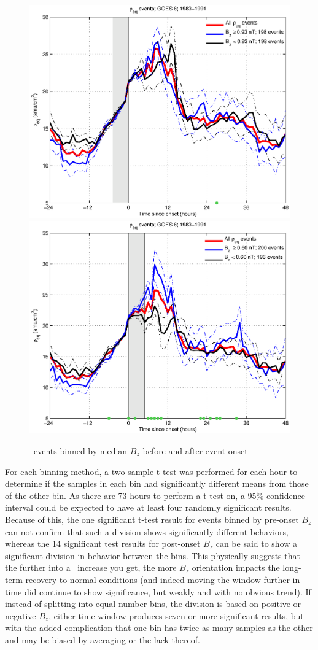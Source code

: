 \begin{figure}[htp!]
	\centering
	\includegraphics[width=0.7\linewidth]{Figures/RhoBinnedBz-case24-t020-tf25-GOES6}
	\includegraphics[width=0.7\linewidth]{Figures/RhoBinnedBz-case24-t025-tf30-GOES6}	
	\caption{\req\ events binned by median $B_z$ before and after event onset}
	\label{fig:RhoBinnedBz}
\end{figure}

For each binning method, a two sample t-test was performed for each hour to determine if the samples in each bin had significantly different means from those of the other bin. As there are 73 hours to perform a t-test on, a 95\% confidence interval could be expected to have at least four randomly significant results. Because of this, the one significant t-test result for events binned by pre-onset $B_z$ can not confirm that such a division shows significantly different behaviors, whereas the 14 significant test results for post-onset $B_z$ can be said to show a significant division in behavior between the bins. This physically suggests that the further into a \req\ increase you get, the more $B_z$ orientation impacts the long-term recovery to normal conditions (and indeed moving the window further in time did continue to show significance, but weakly and with no obvious trend). If instead of splitting into equal-number bins, the division is based on positive or negative $B_z$, either time window produces seven or more significant results, but with the added complication that one bin has twice as many samples as the other and may be biased by averaging or the lack thereof. 